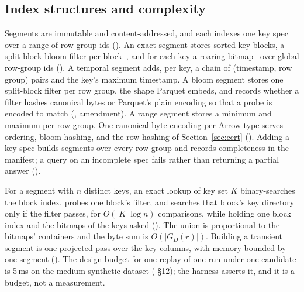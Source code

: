 \subsection{Index structures and complexity}\label{sec:segments}

Segments are immutable and content-addressed, and each indexes one key spec
over a range of row-group ids (). An exact segment stores sorted
key blocks, a split-block bloom filter per block~\cite{parquetbloom}, and for
each key a roaring bitmap~\cite{roaring} over global row-group ids
(). A temporal segment adds, per key, a chain of (timestamp, row group)
pairs and the key's maximum timestamp. A bloom segment stores one split-block
filter per row group, the shape Parquet embeds, and records whether a filter
hashes canonical bytes or Parquet's plain encoding so that a probe is encoded
to match (, amendment). A range segment stores a minimum and maximum
per row group. One canonical byte encoding per Arrow type serves ordering,
bloom hashing, and the row hashing of Section~\ref{sec:cert} ().
Adding a key spec builds segments over every row group and records completeness
in the manifest; a query on an incomplete spec fails rather than returning a
partial answer ().

For a segment with $n$ distinct keys, an exact lookup of key set $K$
binary-searches the block index, probes one block's filter, and searches that
block's key directory only if the filter passes, for $O(|K| \log n)$
comparisons, while holding one block index and the bitmaps of the keys asked
(). The union is proportional to the bitmaps' containers and the byte
sum is $O(|G_D(r)|)$. Building a transient segment is one projected pass over
the key columns, with memory bounded by one segment ().
The design budget for one replay of one run under one candidate is 5\,ms on the
medium synthetic dataset ( \S12); the harness asserts it, and it
is a budget, not a measurement.
